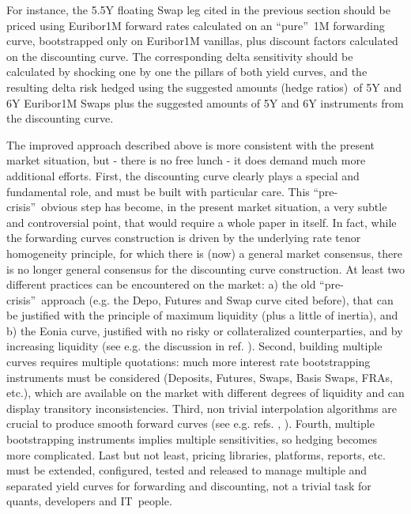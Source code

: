 \documentclass[11pt,reqno]{amsart}
\begin{document}
\par
For instance, the 5.5Y floating Swap leg cited in the previous section should be priced using Euribor1M forward rates calculated on an \textquotedblleft pure\textquotedblright\ 1M forwarding curve, bootstrapped only on Euribor1M vanillas, plus discount factors calculated on the discounting curve. The corresponding delta sensitivity should be calculated by shocking one by one the pillars of both yield curves, and the resulting delta risk hedged using the suggested amounts (hedge ratios)\ of 5Y and 6Y Euribor1M Swaps plus the suggested amounts of 5Y and 6Y instruments from the discounting curve.
\par
The improved approach described above is more consistent with the present market situation, but - there is no free lunch - it does demand much more additional efforts. First, the discounting curve clearly plays a special and fundamental role, and must be built with particular care. This \textquotedblleft pre-crisis\textquotedblright\ obvious step has become, in the present market situation, a very subtle and controversial point, that would require a whole paper in itself. In fact, while the forwarding curves construction is driven by the underlying rate tenor homogeneity principle, for which there is (now) a general market consensus, there is no longer general consensus for the discounting curve construction. At least two different practices can be encountered on the market: a) the old
\textquotedblleft pre-crisis\textquotedblright\ approach (e.g. the Depo, Futures and Swap curve cited before), that can be justified with the principle of maximum liquidity (plus a little of inertia), and b) the Eonia curve, justified with no risky or collateralized counterparties, and by increasing liquidity (see e.g. the discussion in ref. \cite{Mad08}).
Second, building multiple curves requires multiple quotations: much more interest rate bootstrapping instruments must be considered (Deposits, Futures, Swaps, Basis Swaps, FRAs, etc.), which are available on the market with different degrees of liquidity and can display transitory inconsistencies.
Third, non trivial interpolation algorithms are crucial to produce smooth forward curves (see e.g. refs. \cite{HagWes08}, \cite{And07}).
Fourth, multiple bootstrapping instruments implies multiple sensitivities, so hedging becomes more complicated. Last but not least, pricing libraries, platforms, reports, etc. must be extended, configured, tested and released to manage multiple and separated yield curves for forwarding and discounting, not a trivial task for quants, developers and IT\ people.
\end{document}
